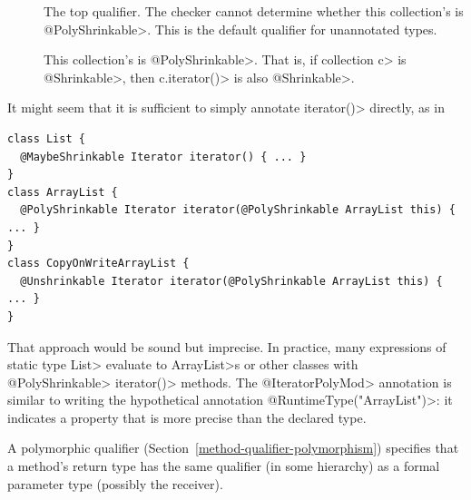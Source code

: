 
\begin{description}
\item[]
The top qualifier.
The checker cannot determine whether this collection's  is
\<@PolyShrinkable>.
This is the default qualifier for unannotated types.

\item[]
This collection's  is \<@PolyShrinkable>.  That is, if
collection \<c> is \<@Shrinkable>, then \<c.iterator()> is also
\<@Shrinkable>.

\end{description}

It might seem that it is sufficient to simply annotate \<iterator()>
directly, as in

\begin{Verbatim}
class List {
  @MaybeShrinkable Iterator iterator() { ... }
}
class ArrayList {
  @PolyShrinkable Iterator iterator(@PolyShrinkable ArrayList this) { ... }
}
class CopyOnWriteArrayList {
  @Unshrinkable Iterator iterator(@PolyShrinkable ArrayList this) { ... }
}
\end{Verbatim}

That approach would be sound but imprecise.
In practice, many expressions of static type \<List> evaluate to
\<ArrayList>s or other classes with \<@PolyShrinkable> \<iterator()> methods.
The \<@IteratorPolyMod> annotation is similar to writing the hypothetical
annotation \<@RuntimeType("ArrayList")>:  it indicates a property that is
more precise than the declared type.



A polymorphic qualifier (Section~\ref{method-qualifier-polymorphism})
specifies that a method's return type has the
same qualifier (in some hierarchy) as a formal parameter type (possibly
the receiver).

